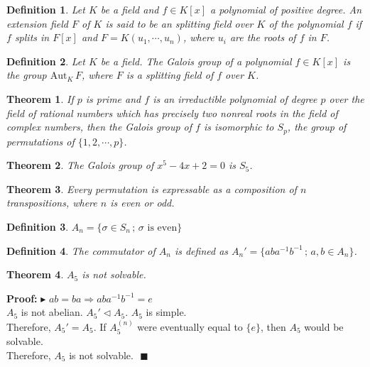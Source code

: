 \documentclass[12pt,a4paper]{article}
\newtheorem{definition}{Definition}[section]
\newtheorem{thm}{Theorem}[section]
\begin{document}
\begin{definition}
Let $K$ be a field and $f \in K[x]$ a polynomial of positive degree. An extension field $F$ of $K$ is said to be an splitting field over $K$ of the polynomial $f$ if $f$ splits in $F[x]$ and $F = K(u_1, \cdots, u_n)$, where $u_i$ are the roots of $f$ in $F$.
\end{definition}

\begin{definition}
Let $K$ be a field. The Galois group of a polynomial $f \in K[x]$ is the group $\text{Aut}_K\,F$, where $F$ is a splitting field of $f$ over $K$.
\end{definition}

\begin{thm}
If $p$ is prime and $f$ is an irreductible polynomial of degree $p$ over the field of rational numbers which has precisely two nonreal roots in the field of complex numbers, then the Galois group of $f$ is isomorphic to $S_p$, the group of permutations of $\{1, 2, \cdots, p \}$.
\end{thm}

\begin{thm}
The Galois group of $x^5 - 4x + 2 = 0$ is $S_5$.
\end{thm}

\begin{thm}
Every permutation is expressable as a composition of $n$ transpositions, where $n$ is even or odd.
\end{thm}

\begin{definition}
$A_n = \{\sigma \in S_n \,;\, \sigma \text{ is even} \}$
\end{definition}

\begin{definition}
The commutator of $A_n$ is defined as $A_n' = \{ ab a^{-1} b^{-1}\,;\,a, b \in A_n \}$.
\end{definition}

\begin{thm}
$A_5$ is not solvable.
\end{thm}

\textbf{Proof:} $\blacktriangleright\,\,ab = ba \Rightarrow ab a^{-1} b^{-1} = e$ \\
$A_5$ is not abelian. $A_5' \lhd A_5$. $A_5$ is simple. \\
Therefore, $A_5' = A_5$. If $A_5^{(n)}$ were eventually equal to $\{ e \}$, then $A_5$ would be solvable. \\
Therefore, $A_5$ is not solvable. $\,\,\blacksquare$
\end{document}
